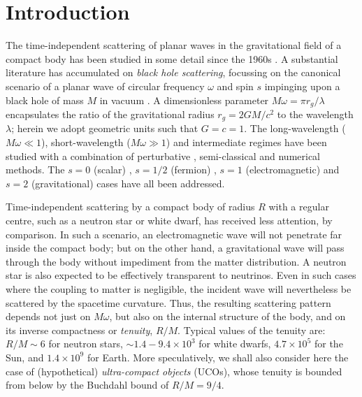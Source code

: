 \documentclass[aps,prd,longbibliography,reprint,twocolumn,amsmath,amssymb,amsfonts,showpacs,footnote,superscriptaddress]{revtex4-1}%
\begin{document}
\date{\today}

\maketitle

\tableofcontents

\section{Introduction}

The time-independent scattering of planar waves in the gravitational field of a compact body has been studied in some detail since the 1960s \cite{Hildreth1964PhDT64, Matzner:1968, Vishveshwara:1970}. A substantial literature has accumulated on \emph{black hole scattering}, focussing on the canonical scenario of a planar wave of circular frequency $\omega$ and spin $s$ \cite{Chrzanowski:1976jb} impinging upon a black hole of mass $M$ in vacuum \cite{Hildreth1964PhDT64, Matzner:1968, Vishveshwara:1970, Mashhoon:1973zz,Fabbri:1975,Sanchez:1977vz,MatznerRyan1978,Handler:1980un,Matzner:1985rjn,Futterman:1988ni,Andersson:1995vi,Glampedakis:2001cx,Dolan:2006vj,Dolan:2007ut,Dolan:2008kf,Crispino:2009xt,Cotaescu:2014jca,Gussmann:2016mkp}. A dimensionless parameter
$
M \omega = \pi r_g / \lambda
$
encapsulates the ratio of the gravitational radius $r_g = 2GM/c^2$ to the wavelength $\lambda$; herein we adopt geometric units such that $G=c=1$. The long-wavelength ($M \omega \ll 1$), short-wavelength ($M \omega \gg 1$) and intermediate regimes have been studied with a combination of perturbative \cite{DeLogi:1977dp,Dolan:2007ut,Guadagnini:2008ha,Sorge:2015yoa}, semi-classical \cite{Matzner:1985rjn, Anninos:1992ih} and numerical methods. The $s = 0$ (scalar) \cite{Matzner:1968,Sanchez:1977vz,Andersson:1995vi,Glampedakis:2001cx,Leite:2019eis}, $s=1/2$ (fermion) \cite{Dolan:2006vj,Cotaescu:2014jca}, $s=1$ (electromagnetic) \cite{Fabbri:1975, Crispino:2009xt, Crispino:2015gua} and $s=2$ (gravitational) cases \cite{MatznerRyan1978,Handler:1980un,Dolan:2008kf} have all been addressed.

Time-independent scattering by a compact body of radius $R$ with a regular centre, such as a neutron star or white dwarf, has received less attention, by comparison. In such a scenario, an electromagnetic wave will not penetrate far inside the compact body; but on the other hand, a gravitational wave will pass through the body without impediment from the matter distribution. A neutron star is also expected to be effectively transparent to neutrinos. Even in such cases where the coupling to matter is negligible, the incident wave will nevertheless be scattered by the spacetime curvature. Thus, the resulting scattering pattern depends not just on $M\omega$, but also on the internal structure of the body, and on its inverse compactness or \emph{tenuity}, $R/M$. Typical values of the tenuity are: $R/M \sim 6$ for neutron stars, $\sim 1.4-9.4 \times 10^3$ for white dwarfs, $4.7 \times 10^5$ for the Sun, and $1.4 \times 10^9$ for Earth. More speculatively, we shall also consider here the case of (hypothetical) \emph{ultra-compact objects} (UCOs), whose tenuity is bounded from below by the Buchdahl bound of $R / M = 9/4$.
\end{document}
